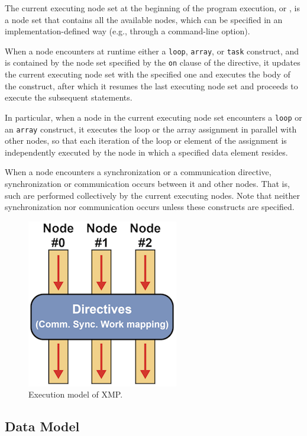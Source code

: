 The current executing node set at the beginning of the program
execution, or {\it {}}, is a node set that
contains all the available nodes, which can be specified in an 
implementation-defined way (e.g., through a command-line option).

When a node encounters at runtime either a {\tt loop}, {\tt array}, or
{\tt task} construct, and is contained by the node set specified by the
{\tt on} clause of the directive, it updates the current executing node
set with the specified one and executes the body of the construct, after
which it resumes the last executing node set and proceeds to execute the
subsequent statements.

In particular, when a node in the current executing node set encounters a
{\tt loop} or an {\tt array} construct, it executes the loop or the array
assignment in parallel with other nodes, so that each iteration of the
loop or element of the assignment is independently executed by the node
in which a specified data element resides.

When a node encounters a synchronization or a communication directive,
synchronization or communication occurs between it and other nodes.
%
That is, such {\it {}} are performed collectively
by the current executing nodes.
%
Note that neither synchronization nor communication occurs unless these
constructs are specified.

\begin{figure}
  \centering
  \includegraphics{figs/execution.png}
  \caption{Execution model of XMP.}\label{fig:exec_model}
\end{figure}


\subsection{Data Model}

